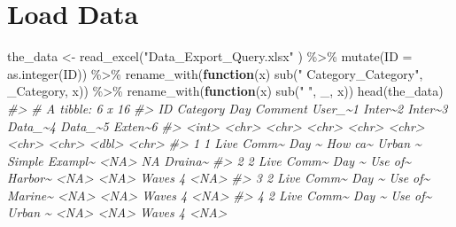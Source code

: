 \documentclass[
]{article}
\newenvironment{Shaded}{\begin{snugshade}}{\end{snugshade}}
\newcommand{\AttributeTok}[1]{\textcolor[rgb]{0.77,0.63,0.00}{#1}}
\newcommand{\CommentTok}[1]{\textcolor[rgb]{0.56,0.35,0.01}{\textit{#1}}}
\newcommand{\ControlFlowTok}[1]{\textcolor[rgb]{0.13,0.29,0.53}{\textbf{#1}}}
\newcommand{\FunctionTok}[1]{\textcolor[rgb]{0.00,0.00,0.00}{#1}}
\newcommand{\NormalTok}[1]{#1}
\newcommand{\OtherTok}[1]{\textcolor[rgb]{0.56,0.35,0.01}{#1}}
\newcommand{\SpecialCharTok}[1]{\textcolor[rgb]{0.00,0.00,0.00}{#1}}
\newcommand{\StringTok}[1]{\textcolor[rgb]{0.31,0.60,0.02}{#1}}
\begin{document}
\hypertarget{load-data}{%
\section{Load Data}\label{load-data}}

\begin{Shaded}
\begin{Highlighting}[]
\NormalTok{the\_data }\OtherTok{\textless{}{-}} \FunctionTok{read\_excel}\NormalTok{(}\StringTok{"Data\_Export\_Query.xlsx"}\NormalTok{ ) }\SpecialCharTok{\%\textgreater{}\%}
  \FunctionTok{mutate}\NormalTok{(}\AttributeTok{ID =} \FunctionTok{as.integer}\NormalTok{(ID)) }\SpecialCharTok{\%\textgreater{}\%}
  \FunctionTok{rename\_with}\NormalTok{(}\ControlFlowTok{function}\NormalTok{(x) }\FunctionTok{sub}\NormalTok{(}\StringTok{" Category\_Category"}\NormalTok{, }\StringTok{\textquotesingle{}\_Category\textquotesingle{}}\NormalTok{, x)) }\SpecialCharTok{\%\textgreater{}\%}
  \FunctionTok{rename\_with}\NormalTok{(}\ControlFlowTok{function}\NormalTok{(x) }\FunctionTok{sub}\NormalTok{(}\StringTok{" "}\NormalTok{, }\StringTok{\textquotesingle{}\_\textquotesingle{}}\NormalTok{, x))}
\FunctionTok{head}\NormalTok{(the\_data)}
\CommentTok{\#\textgreater{} \# A tibble: 6 x 16}
\CommentTok{\#\textgreater{}      ID Category   Day   Comment User\_\textasciitilde{}1 Inter\textasciitilde{}2 Inter\textasciitilde{}3 Data\_\textasciitilde{}4 Data\_\textasciitilde{}5 Exten\textasciitilde{}6}
\CommentTok{\#\textgreater{}   \textless{}int\textgreater{} \textless{}chr\textgreater{}      \textless{}chr\textgreater{} \textless{}chr\textgreater{}   \textless{}chr\textgreater{}   \textless{}chr\textgreater{}   \textless{}chr\textgreater{}   \textless{}chr\textgreater{}     \textless{}dbl\textgreater{} \textless{}chr\textgreater{}  }
\CommentTok{\#\textgreater{} 1     1 Live Comm\textasciitilde{} Day \textasciitilde{} How ca\textasciitilde{} Urban \textasciitilde{} Simple  Exampl\textasciitilde{} \textless{}NA\textgreater{}         NA Draina\textasciitilde{}}
\CommentTok{\#\textgreater{} 2     2 Live Comm\textasciitilde{} Day \textasciitilde{} Use of\textasciitilde{} Harbor\textasciitilde{} \textless{}NA\textgreater{}    \textless{}NA\textgreater{}    Waves         4 \textless{}NA\textgreater{}   }
\CommentTok{\#\textgreater{} 3     2 Live Comm\textasciitilde{} Day \textasciitilde{} Use of\textasciitilde{} Marine\textasciitilde{} \textless{}NA\textgreater{}    \textless{}NA\textgreater{}    Waves         4 \textless{}NA\textgreater{}   }
\CommentTok{\#\textgreater{} 4     2 Live Comm\textasciitilde{} Day \textasciitilde{} Use of\textasciitilde{} Urban \textasciitilde{} \textless{}NA\textgreater{}    \textless{}NA\textgreater{}    Waves         4 \textless{}NA\textgreater{}   }

\end{Highlighting}
\end{Shaded}
\end{document}
